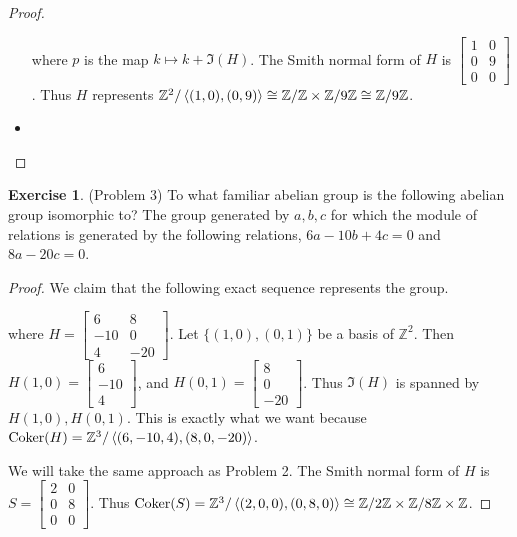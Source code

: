 \documentclass[12pt, psamsfonts]{amsart}
\theoremstyle{definition}
\newtheorem*{exer}{Exercise}
\theoremstyle{remark}
\DeclareMathOperator{\Coker}{Coker}
\numberwithin{equation}{section}
\begin{document}
\begin{proof}
\begin{itemize}
      \begin{center}
      \end{center}

      where $p$ is the map $k \mapsto k + \Im(H)$.
      The Smith normal form of $H$ is $\begin{bmatrix} 1 & 0 \\ 0 & 9 \\ 0 & 0 \end{bmatrix}$.
      Thus $H$ represents $\mathbb{Z}^2/\ev{(1, 0), (0, 9)} \cong \mathbb{Z}/\mathbb{Z} \times \mathbb{Z}/9\mathbb{Z} \cong \mathbb{Z}/9\mathbb{Z}$.
    \item
      \todo[inline,caption={}]{
      }
  \end{itemize}
\end{proof}

\begin{exer}{(Problem 3)}
  To what familiar abelian group is the following abelian group isomorphic to?
  The group generated by $a, b, c$ for which the module of relations is generated by the following relations, $6a - 10b + 4c = 0$ and $8a - 20c = 0$.
\end{exer}

\begin{proof}
  We claim that the following exact sequence represents the group.
  \begin{center}
  \end{center}
  where $H = \begin{bmatrix} 6 & 8 \\ -10 & 0 \\ 4 & -20 \end{bmatrix}$.
  Let $\{ (1, 0), (0, 1) \}$ be a basis of $\mathbb{Z}^2$.
  Then $H(1, 0) = \begin{bmatrix} 6 \\ -10 \\ 4 \end{bmatrix}$, and $H(0, 1) = \begin{bmatrix} 8 \\ 0 \\ -20 \end{bmatrix}$.
  Thus $\Im(H)$ is spanned by $H(1, 0), H(0, 1)$.
  This is exactly what we want because $\Coker(H) = \mathbb{Z}^3/\ev{(6, -10, 4), (8, 0, -20)}$.

  We will take the same approach as Problem 2.
  The Smith normal form of $H$ is $S = \begin{bmatrix} 2 & 0 \\ 0 & 8 \\ 0 & 0 \end{bmatrix}$.
    Thus $\Coker(S) = \mathbb{Z}^3 / \ev{(2, 0, 0), (0, 8, 0)} \cong \mathbb{Z} / 2\mathbb{Z} \times \mathbb{Z} / 8\mathbb{Z} \times \mathbb{Z}$.
\end{proof}
\end{document}
